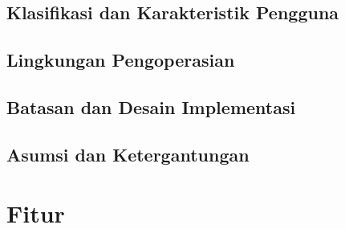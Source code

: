 \documentclass[12pt, a4paper, oneside]{book}
\begin{document}
	\section{Klasifikasi dan Karakteristik Pengguna}
		
	\section{Lingkungan Pengoperasian}
		
	\section{Batasan dan Desain Implementasi}
	\section{Asumsi dan Ketergantungan}
		
	\pagebreak
	\chapter{Fitur}	
	
\end{document}
